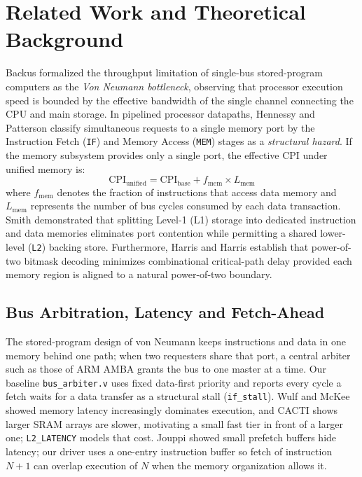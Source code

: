 \documentclass[conference]{IEEEtran}
\begin{document}
\section{Related Work and Theoretical Background}
Backus \cite{backus1978} formalized the throughput limitation of single-bus stored-program computers as the \emph{Von Neumann bottleneck}, observing that processor execution speed is bounded by the effective bandwidth of the single channel connecting the CPU and main storage. In pipelined processor datapaths, Hennessy and Patterson \cite{hennessy2017} classify simultaneous requests to a single memory port by the Instruction Fetch (\texttt{IF}) and Memory Access (\texttt{MEM}) stages as a \emph{structural hazard}. If the memory subsystem provides only a single port, the effective CPI under unified memory is:
\begin{equation}
\text{CPI}_{\text{unified}} = \text{CPI}_{\text{base}} + f_{\text{mem}} \times L_{\text{mem}}
\end{equation}
where $f_{\text{mem}}$ denotes the fraction of instructions that access data memory and $L_{\text{mem}}$ represents the number of bus cycles consumed by each data transaction. Smith \cite{smith1982} demonstrated that splitting Level-1 (L1) storage into dedicated instruction and data memories eliminates port contention while permitting a shared lower-level (\texttt{L2}) backing store. Furthermore, Harris and Harris \cite{harris2021} establish that power-of-two bitmask decoding minimizes combinational critical-path delay provided each memory region is aligned to a natural power-of-two boundary.

\subsection{Bus Arbitration, Latency and Fetch-Ahead}
The stored-program design of von Neumann \cite{vonneumann1945} keeps instructions and data in one memory behind one path; when two requesters share that port, a central arbiter such as those of ARM AMBA \cite{amba1999} grants the bus to one master at a time. Our baseline \texttt{bus\_arbiter.v} uses fixed data-first priority and reports every cycle a fetch waits for a data transfer as a structural stall (\texttt{if\_stall}). Wulf and McKee \cite{wulf1995} showed memory latency increasingly dominates execution, and CACTI \cite{wilton1996} shows larger SRAM arrays are slower, motivating a small fast tier in front of a larger one; \texttt{L2\_LATENCY} models that cost. Jouppi \cite{jouppi1990} showed small prefetch buffers hide latency; our driver uses a one-entry instruction buffer so fetch of instruction $N+1$ can overlap execution of $N$ when the memory organization allows it.
\end{document}
